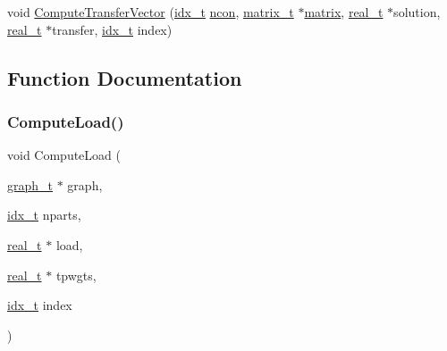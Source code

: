 \begin{DoxyCompactItemize}
\item 
void \hyperlink{a00353_a703664e4eb382833e78b460fd8164ec7}{Compute\+Transfer\+Vector} (\hyperlink{a00876_aaa5262be3e700770163401acb0150f52}{idx\+\_\+t} \hyperlink{a00879_ac1dd31740e8f97fb57dc917ded30253f}{ncon}, \hyperlink{a00754}{matrix\+\_\+t} $\ast$\hyperlink{a01014_af07ff1035f34d77764ff516f110e6832}{matrix}, \hyperlink{a00876_a1924a4f6907cc3833213aba1f07fcbe9}{real\+\_\+t} $\ast$solution, \hyperlink{a00876_a1924a4f6907cc3833213aba1f07fcbe9}{real\+\_\+t} $\ast$transfer, \hyperlink{a00876_aaa5262be3e700770163401acb0150f52}{idx\+\_\+t} index)
\end{DoxyCompactItemize}


\subsection{Function Documentation}
\mbox{\label{a00353_ae334beb9a86e6a2816584c5d9872ecd7}} 
\subsubsection{\texorpdfstring{Compute\+Load()}{ComputeLoad()}}
{\footnotesize\ttfamily void Compute\+Load (\begin{DoxyParamCaption}\item[{\hyperlink{a00734}{graph\+\_\+t} $\ast$}]{graph,  }\item[{\hyperlink{a00876_aaa5262be3e700770163401acb0150f52}{idx\+\_\+t}}]{nparts,  }\item[{\hyperlink{a00876_a1924a4f6907cc3833213aba1f07fcbe9}{real\+\_\+t} $\ast$}]{load,  }\item[{\hyperlink{a00876_a1924a4f6907cc3833213aba1f07fcbe9}{real\+\_\+t} $\ast$}]{tpwgts,  }\item[{\hyperlink{a00876_aaa5262be3e700770163401acb0150f52}{idx\+\_\+t}}]{index }\end{DoxyParamCaption})}

\mbox{\label{a00353_a703664e4eb382833e78b460fd8164ec7}} 
